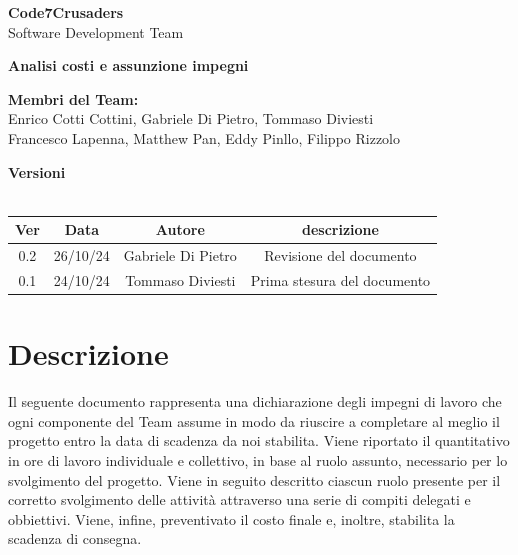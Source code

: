 \documentclass{article}
\begin{document}
\begin{titlepage}
    {\Huge \textbf{Code7Crusaders}}\\
    \vspace{0.5cm}
    {\Large Software Development Team}\\
    \vspace{2cm}
    
    \large \textbf{Analisi costi e assunzione impegni}
    \vspace{5cm}

    \textbf{Membri del Team:}\\
    Enrico Cotti Cottini, Gabriele Di Pietro, Tommaso Diviesti \\
    Francesco Lapenna, Matthew Pan, Eddy Pinllo, Filippo Rizzolo \\
    \vspace{0.5cm}
    
    \vspace{1cm}
\end{titlepage}

\newpage
\begin{center}
    \newline
    \textbf{Versioni}
    \\
    \\
    \begin{tabular}{|c|c|c|c|}
        \hline
        \textbf{Ver} & \textbf{Data} & \textbf{Autore} & \textbf{descrizione}\\
        \hline
        0.2 & 26/10/24 & Gabriele Di Pietro & Revisione del documento \\
        \hline
        0.1 & 24/10/24 & Tommaso Diviesti & Prima stesura del documento \\
        \hline
    \end{tabular}
\end{center}

\newpage
\tableofcontents
\newpage

\section{Descrizione}
Il seguente documento rappresenta una dichiarazione degli impegni di lavoro che ogni componente del Team assume in modo da 
riuscire a completare al meglio il progetto entro la data di scadenza da noi stabilita. Viene riportato il quantitativo in 
ore di lavoro individuale e collettivo, in base al ruolo assunto, necessario per lo svolgimento del progetto. Viene in seguito 
descritto ciascun ruolo presente per il corretto svolgimento delle attività attraverso una serie di compiti delegati e obbiettivi. 
Viene, infine, preventivato il costo finale e, inoltre, stabilita la scadenza di consegna.
\newpage
\end{document}
